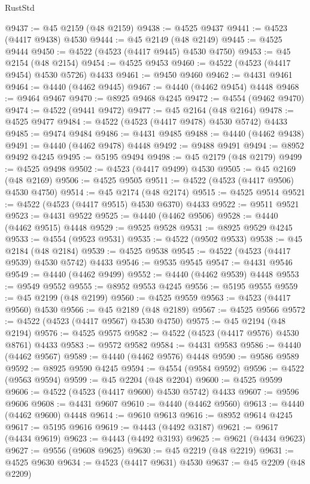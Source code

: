 \begin{lexlean}{RustStd}
\begin{coremodule}
@9437 := @45 @2159 (@48 @2159)
@9438 := @4525 @9437
@9441 := @4523 (@4417 @9438) @4530
@9444 := @45 @2149 (@48 @2149)
@9445 := @4525 @9444
@9450 := @4522 (@4523 (@4417 @9445) @4530 @4750)
@9453 := @45 @2154 (@48 @2154)
@9454 := @4525 @9453
@9460 := @4522 (@4523 (@4417 @9454) @4530 @5726) @4433
@9461 := @9450 @9460
@9462 := @4431 @9461
@9464 := @4440 (@4462 @9445)
@9467 := @4440 (@4462 @9454) @4448
@9468 := @9464 @9467
@9470 := @8925 @9468 @4245
@9472 := @4554 (@9462 @9470)
@9474 := @4522 (@9441 @9472)
@9477 := @45 @2164 (@48 @2164)
@9478 := @4525 @9477
@9484 := @4522 (@4523 (@4417 @9478) @4530 @5742) @4433
@9485 := @9474 @9484
@9486 := @4431 @9485
@9488 := @4440 (@4462 @9438)
@9491 := @4440 (@4462 @9478) @4448
@9492 := @9488 @9491
@9494 := @8952 @9492 @4245
@9495 := @5195 @9494
@9498 := @45 @2179 (@48 @2179)
@9499 := @4525 @9498
@9502 := @4523 (@4417 @9499) @4530
@9505 := @45 @2169 (@48 @2169)
@9506 := @4525 @9505
@9511 := @4522 (@4523 (@4417 @9506) @4530 @4750)
@9514 := @45 @2174 (@48 @2174)
@9515 := @4525 @9514
@9521 := @4522 (@4523 (@4417 @9515) @4530 @6370) @4433
@9522 := @9511 @9521
@9523 := @4431 @9522
@9525 := @4440 (@4462 @9506)
@9528 := @4440 (@4462 @9515) @4448
@9529 := @9525 @9528
@9531 := @8925 @9529 @4245
@9533 := @4554 (@9523 @9531)
@9535 := @4522 (@9502 @9533)
@9538 := @45 @2184 (@48 @2184)
@9539 := @4525 @9538
@9545 := @4522 (@4523 (@4417 @9539) @4530 @5742) @4433
@9546 := @9535 @9545
@9547 := @4431 @9546
@9549 := @4440 (@4462 @9499)
@9552 := @4440 (@4462 @9539) @4448
@9553 := @9549 @9552
@9555 := @8952 @9553 @4245
@9556 := @5195 @9555
@9559 := @45 @2199 (@48 @2199)
@9560 := @4525 @9559
@9563 := @4523 (@4417 @9560) @4530
@9566 := @45 @2189 (@48 @2189)
@9567 := @4525 @9566
@9572 := @4522 (@4523 (@4417 @9567) @4530 @4750)
@9575 := @45 @2194 (@48 @2194)
@9576 := @4525 @9575
@9582 := @4522 (@4523 (@4417 @9576) @4530 @8761) @4433
@9583 := @9572 @9582
@9584 := @4431 @9583
@9586 := @4440 (@4462 @9567)
@9589 := @4440 (@4462 @9576) @4448
@9590 := @9586 @9589
@9592 := @8925 @9590 @4245
@9594 := @4554 (@9584 @9592)
@9596 := @4522 (@9563 @9594)
@9599 := @45 @2204 (@48 @2204)
@9600 := @4525 @9599
@9606 := @4522 (@4523 (@4417 @9600) @4530 @5742) @4433
@9607 := @9596 @9606
@9608 := @4431 @9607
@9610 := @4440 (@4462 @9560)
@9613 := @4440 (@4462 @9600) @4448
@9614 := @9610 @9613
@9616 := @8952 @9614 @4245
@9617 := @5195 @9616
@9619 := @4443 (@4492 @3187)
@9621 := @9617 (@4434 @9619)
@9623 := @4443 (@4492 @3193)
@9625 := @9621 (@4434 @9623)
@9627 := @9556 (@9608 @9625)
@9630 := @45 @2219 (@48 @2219)
@9631 := @4525 @9630
@9634 := @4523 (@4417 @9631) @4530
@9637 := @45 @2209 (@48 @2209)

\end{coremodule}
\end{lexlean}
